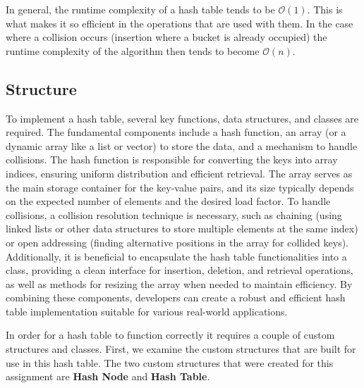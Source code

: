 \noindent In general, the runtime complexity of a hash table tends to be $\mathcal{O}(1)$. This is what makes it so efficient in the operations that are used with them. In the case where a collision occurs
(insertion where a bucket is already occupied) the runtime complexity of the algorithm then tends to become $\mathcal{O}(n)$.

\subsection*{Structure}

To implement a hash table, several key functions, data structures, and classes are required. The fundamental components include a hash function, an array (or a dynamic array like a list or vector) to store 
the data, and a mechanism to handle collisions. The hash function is responsible for converting the keys into array indices, ensuring uniform distribution and efficient retrieval. The array serves as the 
main storage container for the key-value pairs, and its size typically depends on the expected number of elements and the desired load factor. To handle collisions, a collision resolution technique is 
necessary, such as chaining (using linked lists or other data structures to store multiple elements at the same index) or open addressing (finding alternative positions in the array for collided keys). 
Additionally, it is beneficial to encapsulate the hash table functionalities into a class, providing a clean interface for insertion, deletion, and retrieval operations, as well as methods for resizing the 
array when needed to maintain efficiency. By combining these components, developers can create a robust and efficient hash table implementation suitable for various real-world applications.

In order for a hash table to function correctly it requires a couple of custom structures and classes. First, we examine the custom structures that are built for use in this hash table. The two custom structures
that were created for this assignment are \textbf{Hash Node} and \textbf{Hash Table}.

